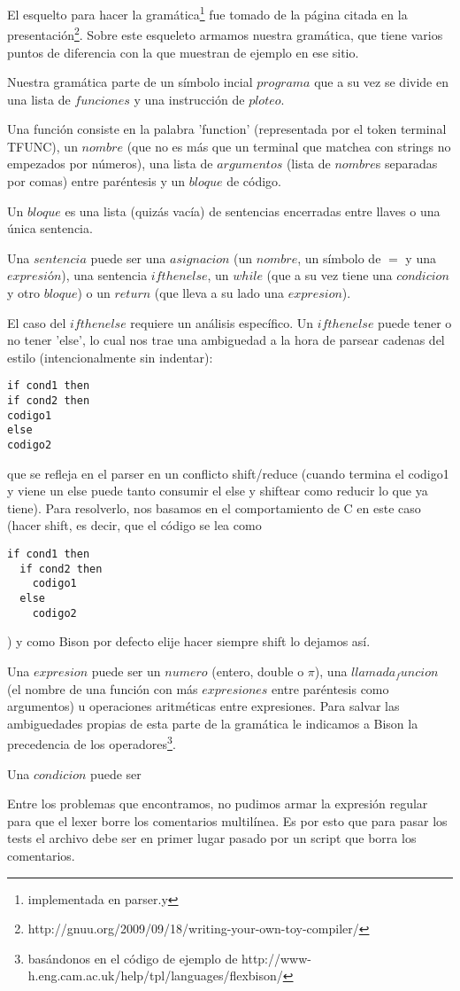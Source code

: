 El esquelto para hacer la gramática\footnote{implementada en parser.y} fue tomado de la página citada en la presentación\footnote{http://gnuu.org/2009/09/18/writing-your-own-toy-compiler/}. Sobre este esqueleto armamos nuestra gramática, que tiene varios puntos de diferencia con la que muestran de ejemplo en ese sitio.

Nuestra gramática parte de un símbolo incial $programa$ que a su vez se divide en una lista de $funciones$ y una instrucción de $ploteo$.

Una función consiste en la palabra 'function' (representada por el token terminal TFUNC), un $nombre$ (que no es más que un terminal que matchea con strings no empezados por números), una lista de $argumentos$ (lista de $nombre$s separadas por comas) entre paréntesis y un $bloque$ de código.

Un $bloque$ es una lista (quizás vacía) de sentencias encerradas entre llaves o una única sentencia.

Una $sentencia$ puede ser una $asignacion$ (un $nombre$, un símbolo de $=$ y una $expresión$), una sentencia $ifthenelse$, un $while$ (que a su vez tiene una $condicion$ y otro $bloque$) o un $return$ (que lleva a su lado una $expresion$).

El caso del $ifthenelse$ requiere un análisis específico. Un $ifthenelse$ puede tener o no tener 'else', lo cual nos trae una ambiguedad a la hora de parsear cadenas del estilo (intencionalmente sin indentar):
\begin{verbatim}
if cond1 then
if cond2 then
codigo1
else
codigo2
\end{verbatim}
que se refleja en el parser en un conflicto shift/reduce (cuando termina el codigo1 y viene un else puede tanto consumir el else y shiftear como reducir lo que ya tiene).
Para resolverlo, nos basamos en el comportamiento de C en este caso (hacer shift, es decir, que el código se lea como
\begin{verbatim}
if cond1 then
  if cond2 then
    codigo1
  else
    codigo2
\end{verbatim}
) y como Bison por defecto elije hacer siempre shift lo dejamos así.

Una $expresion$ puede ser un $numero$ (entero, double o $\pi$), una $llamada_funcion$ (el nombre de una función con más $expresiones$ entre paréntesis como argumentos) u operaciones aritméticas entre expresiones. Para salvar las ambiguedades propias de esta parte de la gramática le indicamos a Bison la precedencia de los operadores\footnote{basándonos en el código de ejemplo de http://www-h.eng.cam.ac.uk/help/tpl/languages/flexbison/}.

Una $condicion$ puede ser 



Entre los problemas que encontramos, no pudimos armar la expresión regular para que el lexer borre los comentarios multilínea. Es por esto que para pasar los tests el archivo debe ser en primer lugar pasado por un script que borra los comentarios.